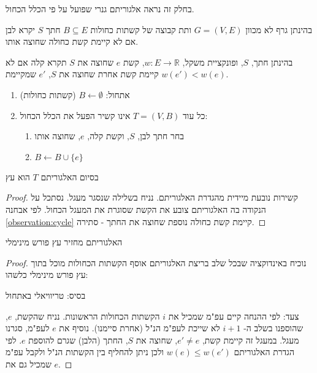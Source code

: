 בחלק זה נראה אלגוריתם גנרי שפועל על פי הכלל הכחול.

\begin{definition}
בהינתן גרף לא מכוון
$G = (V,E)$
ותת קבוצה של קשתות כחולות 
$B \subseteq E$
חתך $S$ יקרא לבן אם לא קיימת קשת כחולה שחוצה אותו.
\end{definition}

\begin{definition}
בהינתן חתך, $S$, ופונקציית משקל, 
$w: E \to \mathbb{R}$,
קשת $e$ שחוצה את $S$ תקרא קלה אם לא קיימת קשת אחרת שחוצה את $S$, 
$e'$
שמקיימת 
$w(e') < w(e)$.
\end{definition}
\begin{enumerate}
\item
אתחול:
$B \leftarrow \emptyset$ 
(קשתות כחולות)
\item
כל עוד 
$T = (V, B)$
אינו קשיר הפעל את הכלל הכחול:
\begin{enumerate}
\item
בחר חתך לבן, $S$, וקשת קלה, $e$, שחוצה אותו 
\item
$B \leftarrow B \cup \{e\}$
\end{enumerate}
\end{enumerate}

\begin{claim}
בסיום האלגוריתם $T$ הוא עץ
\end{claim}
\begin{proof}
קשירות נובעת מיידית מהגדרת האלגוריתם.
נניח בשלילה שנסגר מעגל.
נסתכל על הנקודה בה האלגוריתם צובע את הקשת שסוגרת את המעגל הכחול.
לפי אבחנה 
\ref{observation:cycle}
קיימת קשת כחולה נוספת שחוצה את החתך - סתירה.
\end{proof}

\begin{claim}
\label{claim:blue}
האלגוריתם מחזיר עץ פורש מינימלי
\end{claim}

\begin{proof}
נוכיח באינדוקציה שבכל שלב בריצת האלגוריתם אוסף הקשתות הכחולות מוכל בתוך עץ פורש מינימלי כלשהו:

בסיס: טריוויאלי באתחול

צעד: לפי ההנחה קיים עפ"מ שמכיל את $i$ הקשתות הכחולות הראשונות.
נניח שהקשת, $e$, שהוספנו בשלב ה-%
$i+1$
לא שייכת לעפ"מ הנ"ל (אחרת סיימנו).
נוסיף את $e$ לעפ"מ, סגרנו מעגל.
במעגל זה קיימת קשת,
$e' \neq e$,
שחוצה את $S$, החתך (הלבן) שגרם להוספת $e$.
לפי הגדרת האלגוריתם
$w(e) \leq w(e')$
ולכן ניתן להחליף בין הקשתות הנ"ל ולקבל עפ"מ שמכיל גם את $e$.
\end{proof}


